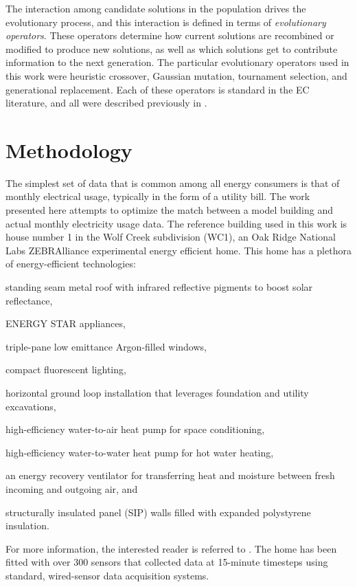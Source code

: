 \documentclass[preprint, review, 12pt]{elsarticle}
\begin{document}
The interaction among candidate solutions in the population drives the evolutionary process, and this interaction is defined in terms of \emph{evolutionary operators}. These operators determine how current solutions are recombined or modified to produce new solutions, as well as which solutions get to contribute information to the next generation. The particular evolutionary operators used in this work were heuristic crossover, Gaussian mutation, tournament selection, and generational replacement. Each of these operators is standard in the EC literature, and all were described previously in \cite{cit:garrett2013}.


\section{Methodology}
\label{sec:methodology}
The simplest set of data that is common among all energy consumers is that of monthly electrical usage, typically in the form of a utility bill. The work presented here attempts to optimize the match between a model building and actual monthly electricity usage data. The reference building used in this work is house number 1 in the Wolf Creek subdivision
(WC1), an Oak Ridge National Labs ZEBRAlliance experimental energy efficient home. This home has a plethora of energy-efficient technologies: 
\begin{inparaenum}[(1)]
\item standing seam metal roof with infrared reflective pigments to boost solar reflectance,
\item ENERGY STAR appliances, 
\item triple-pane low emittance Argon-filled windows, 
\item compact fluorescent lighting, 
\item horizontal ground loop installation that leverages foundation and utility excavations, 
\item high-efficiency water-to-air heat pump for space conditioning, 
\item high-efficiency water-to-water heat pump for hot water heating, 
\item an energy recovery ventilator for transferring heat and moisture between fresh incoming and outgoing air, and 
\item structurally insulated panel (SIP) walls filled with expanded polystyrene insulation.
\end{inparaenum}
For more information, the interested reader is referred to \cite{cit:miller2012,cit:biswas2012}. The home has been fitted with over 300 sensors that collected data at 15-minute timesteps using standard, wired-sensor data acquisition systems.
\end{document}
